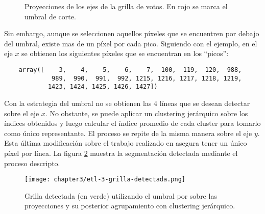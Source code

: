 \begin{figure}[H]
    \centering



    \caption[Proyecciones de los ejes de la grilla de votos]{Proyecciones de los ejes de la grilla de votos. En rojo se marca el umbral de corte.}
    \label{fig:etl-3-proyecciones}
\end{figure}

Sin embargo, aunque se seleccionen aquellos píxeles que se encuentren por debajo del umbral, existe mas de un píxel por
cada pico. Siguiendo con el ejemplo, en el eje $x$ se obtienen los siguientes píxeles que se encuentran en los
``picos'':

\begin{verbatim}
    array([    3,    4,    5,    6,    7,  100,  119,  120,  988, 
             989,  990,  991,  992, 1215, 1216, 1217, 1218, 1219, 
            1423, 1424, 1425, 1426, 1427])
\end{verbatim}

Con la estrategia del umbral no se obtienen las 4 líneas que se desean detectar sobre el eje $x$. No obstante, se puede
aplicar un clustering jerárquico sobre los índices obtenidos y luego calcular el índice promedio de cada cluster para
tomarlo como único representante. El proceso se repite de la misma manera sobre el eje $y$. Esta última modificación
sobre el trabajo realizado en \parencite{lamagna2016lectura} asegura tener un único píxel por línea. La figura \ref{fig:etl-3-grilla-detectada} muestra
la segmentación detectada mediante el proceso descripto.

\begin{figure}[H]
    \centering
    \texttt{[image: chapter3/etl-3-grilla-detectada.png]}
    \caption[Segmentación de la grilla detectada]{Grilla detectada (en verde) utilizando el umbral por sobre las proyecciones y su posterior agrupamiento con clustering jerárquico.}
    \label{fig:etl-3-grilla-detectada}
\end{figure}

